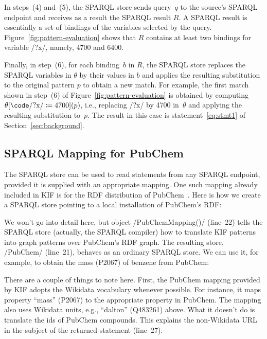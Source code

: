 In steps~(4) and~(5), the SPARQL store sends query~$q$ to the source's SPARQL endpoint and receives as a result the SPARQL result $R$.
A SPARQL result is essentially a set of bindings of the variables selected by the query.
Figure~\ref{fig:pattern-evaluation} shows that $R$ contains at least two bindings for variable \code/?x/, namely, 4700 and 6400.





Finally, in step~(6), for each binding~$b$ in $R$, the SPARQL store replaces the SPARQL variables in $\theta$ by their values in $b$ and applies the resulting substitution to the original pattern $p$ to obtain a new match.
For example, the first match shown in step~(6) of Figure~\ref{fig:pattern-evaluation} is obtained by computing $\theta[\text{\code/?x/}\coloneq{4700}](p)$, i.e., replacing \code/?x/ by 4700 in~$\theta$ and applying the resulting substitution to~$p$.
The result in this case is statement~\eqref{eq:stmt1} of Section~\ref{sec:background}.


\subsection{SPARQL Mapping for PubChem}%
\label{sub:sparql-mapping-for-pubchem}


The SPARQL store can be used to read statements from any SPARQL endpoint, provided it is supplied with an appropriate mapping.
One such mapping already included in KIF is for the RDF distribution of PubChem~\cite{Fu-G-2015,Kim-S-2023}.
Here is how we create a SPARQL store pointing to a local installation of PubChem's RDF\@:
%


We won't go into detail here, but object \code/PubChemMapping()/ (line~22) tells the SPARQL store (actually, the SPARQL compiler) how to translate KIF patterns into graph patterns over PubChem's RDF graph.
The resulting store, \code/PubChem/ (line~21), behaves as an ordinary SPARQL store.
We can use it, for example, to obtain the mass (P2067) of benzene from PubChem:
%


There are a couple of things to note here.
First, the PubChem mapping provided by KIF adopts the Wikidata vocabulary whenever possible.
For instance, it maps property ``mass'' (P2067) to the appropriate property in PubChem.
The mapping also uses Wikidata units, e.g., ``dalton'' (Q483261) above.
What it doesn't do is translate the ids of PubChem compounds.
This explains the non-Wikidata URL in the subject of the returned statement (line~27).


